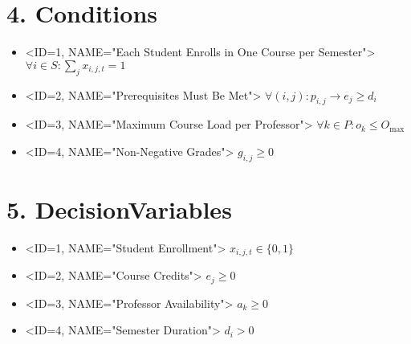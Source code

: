 \documentclass{book}
\begin{document}
\section{4. Conditions}

\begin{itemize}
    \item <ID=1, NAME="Each Student Enrolls in One Course per Semester">
        $\forall i \in S: \sum_{j} x_{i,j,t} = 1$
    \item <ID=2, NAME="Prerequisites Must Be Met">
        $\forall (i,j): p_{i,j} \rightarrow e_j \geq d_i$
    \item <ID=3, NAME="Maximum Course Load per Professor">
        $\forall k \in P: o_k \leq O_{\text{max}}$
    \item <ID=4, NAME="Non-Negative Grades">
        $g_{i,j} \geq 0$
\end{itemize}

\section{5. DecisionVariables}

\begin{itemize}
    \item <ID=1, NAME="Student Enrollment">
        $x_{i,j,t} \in \{0,1\}$
    \item <ID=2, NAME="Course Credits">
        $e_j \geq 0$
    \item <ID=3, NAME="Professor Availability">
        $a_k \geq 0$
    \item <ID=4, NAME="Semester Duration">
        $d_i > 0$
\end{itemize}
\end{document}
